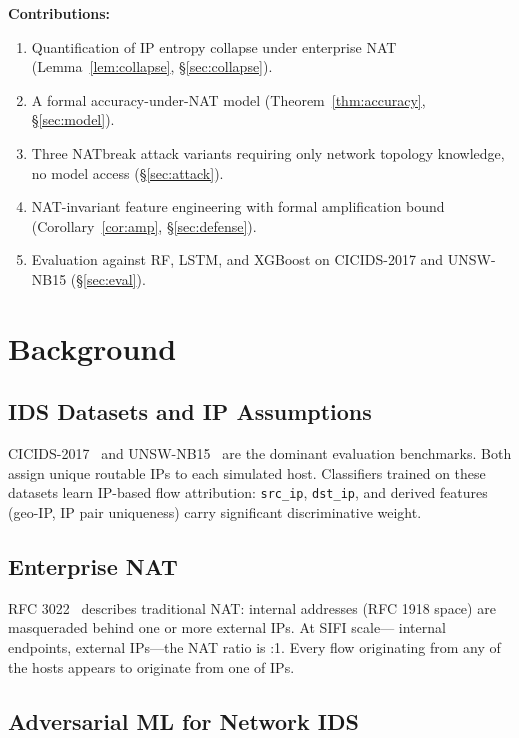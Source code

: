 \documentclass[conference]{IEEEtran}
\begin{document}
\textbf{Contributions:}
\begin{enumerate}
  \item Quantification of IP entropy collapse under enterprise NAT
    (Lemma~\ref{lem:collapse}, \S\ref{sec:collapse}).
  \item A formal accuracy-under-NAT model (Theorem~\ref{thm:accuracy},
    \S\ref{sec:model}).
  \item Three NATbreak attack variants requiring only network topology knowledge,
    no model access (\S\ref{sec:attack}).
  \item NAT-invariant feature engineering with formal amplification bound
    (Corollary~\ref{cor:amp}, \S\ref{sec:defense}).
  \item Evaluation against RF, LSTM, and XGBoost on CICIDS-2017 and UNSW-NB15
    (\S\ref{sec:eval}).
\end{enumerate}

\section{Background}

\subsection{IDS Datasets and IP Assumptions}

CICIDS-2017~\cite{Sharafaldin2018} and UNSW-NB15~\cite{Moustafa2015} are
the dominant evaluation benchmarks.
Both assign unique routable IPs to each simulated host.
Classifiers trained on these datasets learn IP-based flow attribution:
\texttt{src\_ip}, \texttt{dst\_ip}, and derived features (geo-IP, IP pair
uniqueness) carry significant discriminative weight.

\subsection{Enterprise NAT}

RFC 3022~\cite{RFC3022} describes traditional NAT: internal addresses
(RFC 1918 space) are masqueraded behind one or more external IPs.
At SIFI scale---\SifiNEndpoints{} internal endpoints, \SifiNExternalIps{}
external IPs---the NAT ratio is \NatRatioLarge{}:1.
Every flow originating from any of the \SifiNEndpoints{} hosts appears
to originate from one of \SifiNExternalIps{} IPs.

\subsection{Adversarial ML for Network IDS}
\end{document}
